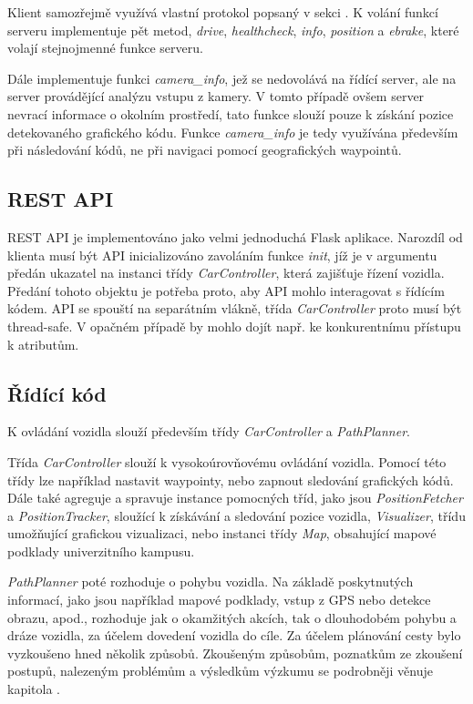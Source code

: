 \documentclass[czech, bachelor]{diploma}
\begin{document}
Klient samozřejmě využívá vlastní protokol popsaný v sekci . K volání funkcí serveru implementuje pět
metod, \emph{drive}, \emph{healthcheck}, \emph{info}, \emph{position} a \emph{ebrake}, které volají stejnojmenné funkce serveru.

Dále implementuje funkci \emph{camera\_info}, jež se nedovolává na řídící server, ale na server provádějící analýzu vstupu
z kamery. V tomto případě ovšem server nevrací informace o okolním prostředí, tato funkce slouží pouze k získání pozice
detekovaného grafického kódu. Funkce \emph{camera\_info} je tedy využívána především při následování kódů, ne při navigaci pomocí
geografických waypointů.

\subsection{REST API}

REST API je implementováno jako velmi jednoduchá Flask aplikace. Narozdíl od klienta musí být API inicializováno zavoláním funkce
\emph{init}, jíž je v argumentu předán ukazatel na instanci třídy \emph{CarController}, která zajišťuje řízení vozidla. Předání
tohoto objektu je potřeba proto, aby API mohlo interagovat s řídícím kódem. API se spouští na separátním vlákně, třída
\emph{CarController} proto musí být thread-safe. V opačném případě by mohlo dojít např. ke konkurentnímu přístupu k atributům.

\subsection{Řídící kód}

K ovládání vozidla slouží především třídy \emph{CarController} a \emph{PathPlanner}.

Třída \emph{CarController} slouží k vysokoúrovňovému ovládání vozidla. Pomocí této třídy lze například nastavit waypointy, nebo
zapnout sledování grafických kódů. Dále také agreguje a spravuje instance pomocných tříd, jako jsou \emph{PositionFetcher}
a \emph{PositionTracker}, sloužící k získávání a sledování pozice vozidla, \emph{Visualizer}, třídu umožňující grafickou
vizualizaci, nebo instanci třídy \emph{Map}, obsahující mapové podklady univerzitního kampusu.

\emph{PathPlanner} poté rozhoduje o pohybu vozidla. Na základě poskytnutých informací, jako jsou například mapové podklady, vstup
z GPS nebo detekce obrazu, apod., rozhoduje jak o okamžitých akcích, tak o dlouhodobém pohybu a dráze vozidla, za účelem dovedení
vozidla do cíle. Za účelem plánování cesty bylo vyzkoušeno hned několik způsobů. Zkoušeným způsobům, poznatkům ze zkoušení
postupů, nalezeným problémům a výsledkům výzkumu se podrobněji věnuje kapitola .
\end{document}
